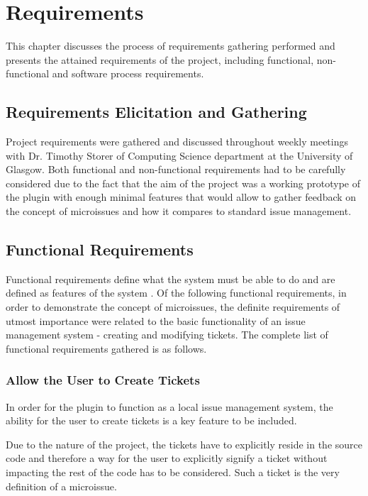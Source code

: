 \documentclass{4thYearProject}
\begin{document}
\chapter{Requirements}

This chapter discusses the process of requirements gathering performed and presents the attained requirements of the project, including functional, non-functional and software process requirements. 

\section{Requirements Elicitation and Gathering}

Project requirements were gathered and discussed throughout weekly meetings with Dr. Timothy Storer of Computing Science department at the University of Glasgow. Both functional and non-functional requirements had to be carefully considered due to the fact that the aim of the project was a working prototype of the plugin with enough minimal features that would allow to gather feedback on the concept of microissues and how it compares to standard issue management. 


\section{Functional Requirements}

Functional requirements define what the system must be able to do and are defined as features of the system \cite{systemfundamentals}. Of the following functional requirements, in order to demonstrate the concept of microissues, the definite requirements of utmost importance were related to the basic functionality of an issue management system - creating and modifying tickets. The complete list of functional requirements gathered is as follows.

\subsection{Allow the User to Create Tickets}

In order for the plugin to function as a local issue management system, the ability for the user to create tickets is a key feature to be included. 

Due to the nature of the project, the tickets have to explicitly reside in the source code and therefore a way for the user to explicitly signify a ticket without impacting the rest of the code has to be considered. Such a ticket is the very definition of a microissue.
\end{document}
